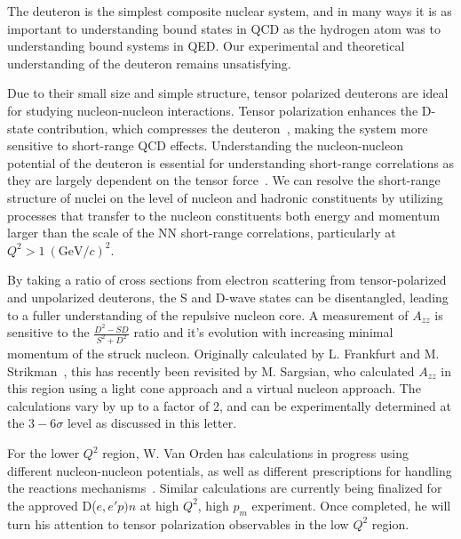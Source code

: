 
The deuteron is the simplest composite nuclear system, and in many ways it is as important to understanding bound states in QCD as the hydrogen atom was to understanding bound systems in QED.  Our experimental and theoretical understanding of the deuteron remains unsatisfying. 

Due to their small size and simple structure, tensor polarized deuterons are ideal for studying nucleon-nucleon interactions. Tensor polarization enhances the D-state contribution, which compresses the deuteron~\cite{Forest:1996kp}, 
making the system more sensitive to short-range QCD effects. Understanding the nucleon-nucleon potential of the deuteron is essential for understanding short-range correlations as they are largely dependent on the tensor force~\cite{Arrington:2011xs}. We can resolve the short-range structure of nuclei on the level of nucleon and hadronic constituents by utilizing processes that transfer to the nucleon constituents both energy and momentum larger than the scale of the NN short-range correlations, particularly at $Q^2>1~(\mathrm{GeV}/c)^2$.


By taking a ratio of cross sections from electron scattering from tensor-polarized and unpolarized deuterons, the S and D-wave states can be disentangled, leading to a fuller understanding of the repulsive nucleon core. A measurement of $A_{zz}$ is sensitive to the $\frac{D^2-SD}{S^2+D^2}$ ratio and it's evolution with increasing minimal momentum of the struck nucleon. Originally calculated by L. Frankfurt and M. Strikman~\cite{Frankfurt:1988nt}, this has recently been revisited by M. Sargsian, who calculated $A_{zz}$ in this region using a light cone approach and a virtual nucleon approach. The calculations vary by up to a factor of 2, and can be experimentally determined at the $3-6\sigma$ level as discussed in this letter.



For the lower $Q^2$ region, W. Van Orden has calculations in progress using different nucleon-nucleon potentials, as well as different prescriptions for handling the reactions mechanisms~\cite{vanorden-convo}. Similar calculations are currently being finalized for the approved
D($e,e'p)n$ at high $Q^2$, high $p_m$ experiment. Once completed, he will turn his attention to tensor polarization observables in the low $Q^2$ region.

